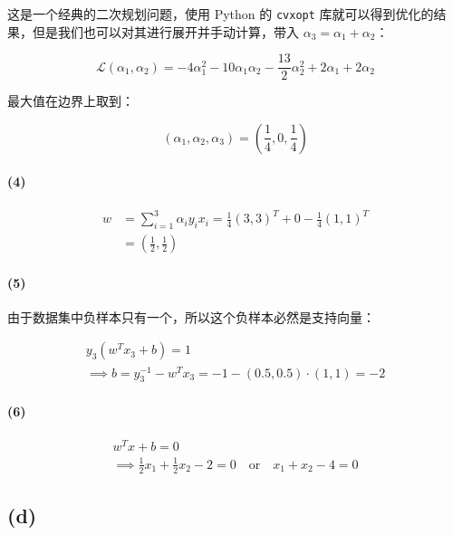 \documentclass{ctexart}
\begin{document}
这是一个经典的二次规划问题，使用 Python 的 \texttt{cvxopt}
库就可以得到优化的结果，但是我们也可以对其进行展开并手动计算，带入
\(\alpha_3=\alpha_1+\alpha_2\)：

\begin{equation*}
\mathcal L(\alpha_1,\alpha_2)
=
-4\alpha_1^2
-10\alpha_1\alpha_2
-\frac{13}{2}\alpha_2^2
+2\alpha_1
+2\alpha_2
\end{equation*}

最大值在边界上取到：

\begin{equation*}
(\alpha_1,\alpha_2,\alpha_3) = \left(\frac{1}{4},0,\frac{1}{4}\right)
\end{equation*}


\paragraph{(4)}\label{section-3}


\begin{equation*}
\begin{aligned}
w &= \sum_{i=1}^3\alpha_iy_ix_i=\frac{1}{4}(3,3)^T+0-\frac{1}{4}(1,1)^T \\
&= \left(\frac{1}{2},\frac{1}{2}\right)
\end{aligned}
\end{equation*}


\paragraph{(5)}\label{section-4}

由于数据集中负样本只有一个，所以这个负样本必然是支持向量：


\begin{gather*}
y_3(w^Tx_3+b)=1 \\
\implies b = y_3^{-1}-w^Tx_3=-1-(0.5,0.5)\cdot(1,1)=-2
\end{gather*}


\paragraph{(6)}\label{section-5}


\begin{gather*}
w^Tx+b=0\\
\implies \frac{1}{2}x_1+\frac{1}{2}x_2-2=0\quad \text{or}\quad x_1+x_2-4=0
\end{gather*}


\subsection{(d)}\label{d}
\end{document}
